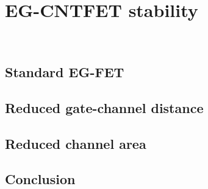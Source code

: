 \chapter{EG-CNTFET stability}
\label{cap:chapter3}



\newpage
\thispagestyle{empty}
\ %
\newpage


\section{Standard EG-FET}
\label{sec:big_channel}




\section{Reduced gate-channel distance}
\label{sec:small_distance}




\section{Reduced channel area}
\label{sec:small_channel}




\section{Conclusion}
\label{sec:stability_conclusion}


\newpage
\thispagestyle{empty}
\ %
\newpage
